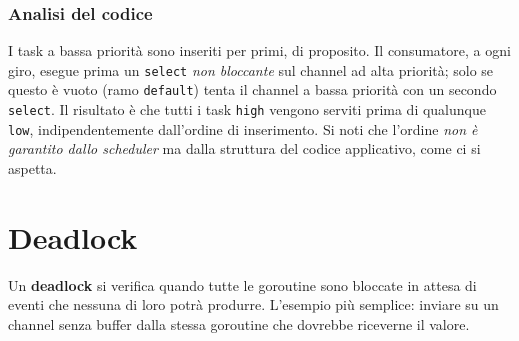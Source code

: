\documentclass[11pt,a4paper]{report}
\newcommand{\cod}[1]{\texttt{#1}}
\begin{document}
\subsubsection*{Analisi del codice}

I task a bassa priorità sono inseriti per primi, di proposito. Il consumatore, a
ogni giro, esegue prima un \cod{select} \emph{non bloccante} sul channel ad alta
priorità; solo se questo è vuoto (ramo \cod{default}) tenta il channel a bassa
priorità con un secondo \cod{select}. Il risultato è che tutti i task \cod{high}
vengono serviti prima di qualunque \cod{low}, indipendentemente dall'ordine di
inserimento. Si noti che l'ordine \emph{non è garantito dallo scheduler} ma
dalla struttura del codice applicativo, come ci si aspetta.

\section{Deadlock}\label{sec:deadlock}

Un \textbf{deadlock} si verifica quando tutte le goroutine sono bloccate in attesa
di eventi che nessuna di loro potrà produrre. L'esempio più semplice:
inviare su un channel senza buffer dalla stessa goroutine che dovrebbe
riceverne il valore.
\end{document}
